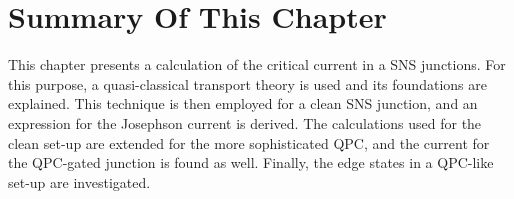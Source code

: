 \section{Summary Of This Chapter}
This chapter presents a calculation of the critical current in a SNS junctions. For this purpose, a quasi-classical transport theory is used and its foundations are explained. This technique is then employed for a clean SNS junction, and an expression for the Josephson current is derived. The calculations used for the clean set-up are extended for the more sophisticated QPC, and the current for the QPC-gated junction is found as well. Finally, the edge states in a QPC-like set-up are investigated. 